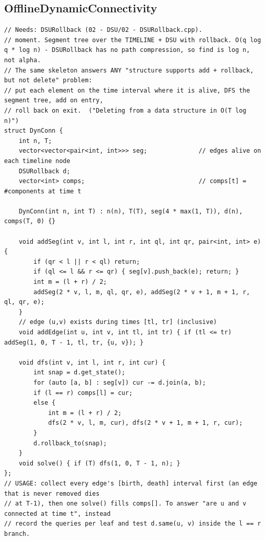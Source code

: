 \documentclass[9pt,a4paper,twocolumn]{extarticle}
\begin{document}
\filbreak
\subsection{OfflineDynamicConnectivity}
\nopagebreak
\begin{lstlisting}
// Needs: DSURollback (02 - DSU/02 - DSURollback.cpp).
// moment. Segment tree over the TIMELINE + DSU with rollback. O(q log q * log n) - DSURollback has no path compression, so find is log n, not alpha.
// The same skeleton answers ANY "structure supports add + rollback, but not delete" problem:
// put each element on the time interval where it is alive, DFS the segment tree, add on entry,
// roll back on exit.  ("Deleting from a data structure in O(T log n)")
struct DynConn {
    int n, T;
    vector<vector<pair<int, int>>> seg;              // edges alive on each timeline node
    DSURollback d;
    vector<int> comps;                               // comps[t] = #components at time t

    DynConn(int n, int T) : n(n), T(T), seg(4 * max(1, T)), d(n), comps(T, 0) {}

    void addSeg(int v, int l, int r, int ql, int qr, pair<int, int> e) {
        if (qr < l || r < ql) return;
        if (ql <= l && r <= qr) { seg[v].push_back(e); return; }
        int m = (l + r) / 2;
        addSeg(2 * v, l, m, ql, qr, e), addSeg(2 * v + 1, m + 1, r, ql, qr, e);
    }
    // edge (u,v) exists during times [tl, tr] (inclusive)
    void addEdge(int u, int v, int tl, int tr) { if (tl <= tr) addSeg(1, 0, T - 1, tl, tr, {u, v}); }

    void dfs(int v, int l, int r, int cur) {
        int snap = d.get_state();
        for (auto [a, b] : seg[v]) cur -= d.join(a, b);
        if (l == r) comps[l] = cur;
        else {
            int m = (l + r) / 2;
            dfs(2 * v, l, m, cur), dfs(2 * v + 1, m + 1, r, cur);
        }
        d.rollback_to(snap);
    }
    void solve() { if (T) dfs(1, 0, T - 1, n); }
};
// USAGE: collect every edge's [birth, death] interval first (an edge that is never removed dies
// at T-1), then one solve() fills comps[]. To answer "are u and v connected at time t", instead
// record the queries per leaf and test d.same(u, v) inside the l == r branch.
\end{lstlisting}

\filbreak
\end{document}
